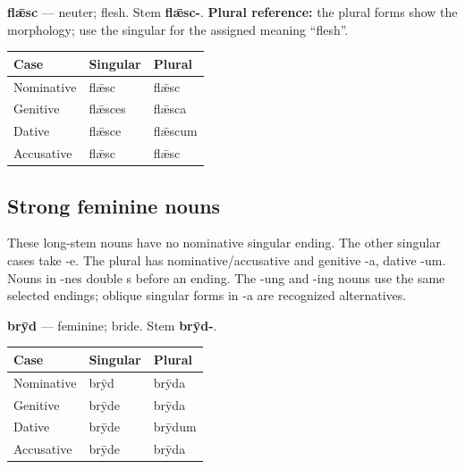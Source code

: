 \textbf{flǣsc} — neuter; flesh. Stem \textbf{flǣsc-}. \textbf{Plural reference:} the plural forms show the morphology; use the singular for the assigned meaning “flesh”.

\par\begingroup
\fontsize{10.5}{13.2}\selectfont
\setlength{\LTleft}{0pt}\setlength{\LTright}{\fill}
\noindent
\begin{tabular}{@{}>{\raggedright\arraybackslash}p{39.46mm}>{\raggedright\arraybackslash}p{39.46mm}>{\raggedright\arraybackslash}p{39.46mm}@{}}
\toprule
\textbf{Case} & \textbf{Singular} & \textbf{Plural} \\
\midrule
Nominative & flǣsc & flǣsc \\
Genitive & flǣsces & flǣsca \\
Dative & flǣsce & flǣscum \\
Accusative & flǣsc & flǣsc \\
\bottomrule
\end{tabular}
\par\endgroup

\subsection*{Strong feminine nouns}

These long-stem nouns have no nominative singular ending. The other singular cases take -e. The plural has nominative/\allowbreak{}accusative and genitive -a, dative -um. Nouns in -nes double s before an ending. The -ung and -ing nouns use the same selected endings; oblique singular forms in -a are recognized alternatives.

\textbf{brȳd} — feminine; bride. Stem \textbf{brȳd-}.

\par\begingroup
\fontsize{10.5}{13.2}\selectfont
\setlength{\LTleft}{0pt}\setlength{\LTright}{\fill}
\noindent
\begin{tabular}{@{}>{\raggedright\arraybackslash}p{39.46mm}>{\raggedright\arraybackslash}p{39.46mm}>{\raggedright\arraybackslash}p{39.46mm}@{}}
\toprule
\textbf{Case} & \textbf{Singular} & \textbf{Plural} \\
\midrule
Nominative & brȳd & brȳda \\
Genitive & brȳde & brȳda \\
Dative & brȳde & brȳdum \\
Accusative & brȳde & brȳda \\
\bottomrule
\end{tabular}
\par\endgroup

